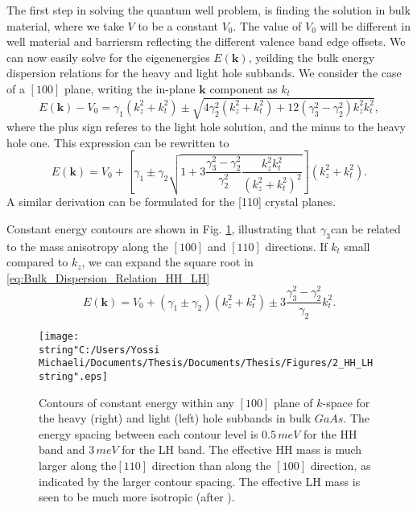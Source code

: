 The first step in solving the quantum well problem, is finding the
solution in bulk material, where we take $V$ to be a constant $V_{0}$.
The value of $V_{0}$ will be different in well material and barriersm
reflecting the different valence band edge offsets. We can now easily
solve for the eigenenergies $E(\mathbf{k})$, yeilding the bulk energy
dispersion relations for the heavy and light hole subbands. We consider
the case of a $\left[100\right]$ plane, writing the in-plane $\mathbf{k}$
component as $k_{t}$\begin{equation}
E(\mathbf{k})-V_{0}=\gamma_{1}\left(k_{z}^{2}+k_{t}^{2}\right)\pm\sqrt{4\gamma_{2}^{2}\left(k_{z}^{2}+k_{t}^{2}\right)+12\left(\gamma_{3}^{2}-\gamma_{2}^{2}\right)k_{z}^{2}k_{t}^{2}},\label{eq:Bulk_Dispersion_Relation_HH_LH}\end{equation}
where the plus sign referes to the light hole solution, and the minus
to the heavy hole one. This expression can be rewritten to \begin{equation}
E(\mathbf{k})=V_{0}+\left[\gamma_{1}\pm\gamma_{2}\sqrt{1+3\frac{\gamma_{3}^{2}-\gamma_{2}^{2}}{\gamma_{2}^{2}}\frac{k_{z}^{2}k_{t}^{2}}{\left(k_{z}^{2}+k_{t}^{2}\right)^{2}}}\right]\left(k_{z}^{2}+k_{t}^{2}\right).\end{equation}
A similar derivation can be formulated for the {[}110{]} crystal planes.

Constant energy contours are shown in Fig. \ref{fig:HH_LH_Contours_Of_Constant_Energy},
illustrating that $\gamma_{3}$can be related to the mass anisotropy
along the $\left[100\right]$ and $\left[110\right]$ directions.
If $k_{t}$ small compared to $k_{z}$, we can expand the square root
in \ref{eq:Bulk_Dispersion_Relation_HH_LH}\begin{equation}
E(\mathbf{k})=V_{0}+\left(\gamma_{1}\pm\gamma_{2}\right)\left(k_{z}^{2}+k_{t}^{2}\right)\pm3\frac{\gamma_{3}^{2}-\gamma_{2}^{2}}{\gamma_{2}}k_{t}^{2}.\end{equation}


%
\begin{figure}
\begin{centering}
\texttt{[image: \\string"C:/Users/Yossi Michaeli/Documents/Thesis/Documents/Thesis/Figures/2\_HH\_LH\\string".eps]}
\par\end{centering}

\caption{\label{fig:HH_LH_Contours_Of_Constant_Energy}Contours of constant
energy within any $[100]$ plane of $k$-space for the heavy (right)
and light (left) hole subbands in bulk $GaAs$. The energy spacing
between each contour level is $0.5\, meV$ for the HH band and $3\, meV$
for the LH band. The effective HH mass is much larger along the$\left[110\right]$
direction than along the $\left[100\right]$ direction, as indicated
by the larger contour spacing. The effective LH mass is seen to be
much more isotropic (after \citet{Zory1993}). }



\end{figure}


